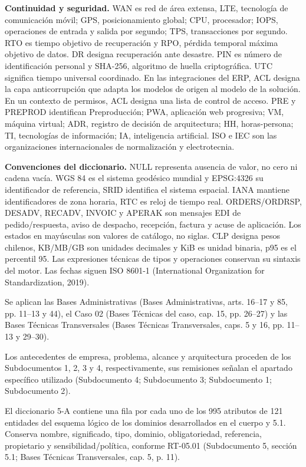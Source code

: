 \textbf{Continuidad y seguridad.} WAN es red de área extensa, LTE, tecnología de comunicación móvil; GPS, posicionamiento global; CPU, procesador; IOPS, operaciones de entrada y salida por segundo; TPS, transacciones por segundo. RTO es tiempo objetivo de recuperación y RPO, pérdida temporal máxima objetivo de datos. DR designa recuperación ante desastre. PIN es número de identificación personal y SHA-256, algoritmo de huella criptográfica. UTC significa tiempo universal coordinado. En las integraciones del ERP, ACL designa la capa anticorrupción que adapta los modelos de origen al modelo de la solución. En un contexto de permisos, ACL designa una lista de control de acceso. PRE y PREPROD identifican Preproducción; PWA, aplicación web progresiva; VM, máquina virtual; ADR, registro de decisión de arquitectura; HH, horas-persona; TI, tecnologías de información; IA, inteligencia artificial. ISO e IEC son las organizaciones internacionales de normalización y electrotecnia.

\textbf{Convenciones del diccionario.} NULL representa ausencia de valor, no cero ni cadena vacía. WGS 84 es el sistema geodésico mundial y EPSG:4326 su identificador de referencia, SRID identifica el sistema espacial. IANA mantiene identificadores de zona horaria, RTC es reloj de tiempo real. ORDERS/ORDRSP, DESADV, RECADV, INVOIC y APERAK son mensajes EDI de pedido/respuesta, aviso de despacho, recepción, factura y acuse de aplicación. Los estados en mayúsculas son valores de catálogo, no siglas. CLP designa pesos chilenos, KB/MB/GB son unidades decimales y KiB es unidad binaria, p95 es el percentil 95. Las expresiones técnicas de tipos y operaciones conservan su sintaxis del motor. Las fechas siguen ISO 8601-1 (International Organization for Standardization, 2019).

Se aplican las Bases Administrativas (Bases Administrativas, arts. 16–17 y 85, pp. 11–13 y 44), el Caso 02 (Bases Técnicas del caso, cap. 15, pp. 26–27) y las Bases Técnicas Transversales (Bases Técnicas Transversales, caps. 5 y 16, pp. 11–13 y 29–30).

Los antecedentes de empresa, problema, alcance y arquitectura proceden de los Subdocumentos 1, 2, 3 y 4, respectivamente, sus remisiones señalan el apartado específico utilizado (Subdocumento 4; Subdocumento 3; Subdocumento 1; Subdocumento 2).

El diccionario 5-A contiene una fila por cada uno de los 995 atributos de 121 entidades del esquema lógico de los dominios desarrollados en el cuerpo y 5.1. Conserva nombre, significado, tipo, dominio, obligatoriedad, referencia, propietario y sensibilidad/política, conforme RT-05.01 (Subdocumento 5, sección 5.1; Bases Técnicas Transversales, cap. 5, p. 11).

